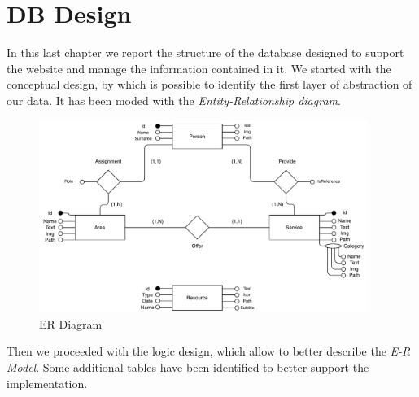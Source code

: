 \documentclass[12pt]{report}
\begin{document}
\chapter{DB Design}
In this last chapter we report the structure of the database designed 
to support the website and manage the information contained in it. 
We started with the conceptual design, by which is possible to identify
the first layer of abstraction of our data. It has been moded with the 
\emph{Entity-Relationship diagram}.\\
\begin{figure}[H]
	\centering
	\includegraphics[width=0.95\textwidth]{ER_model.pdf}
	\caption{ER Diagram}
\end{figure}
\noindent
Then we proceeded with the logic design, which allow to better describe the
\emph{E-R Model}. Some additional tables have been identified to better 
support the implementation.
\clearpage
\end{document}
